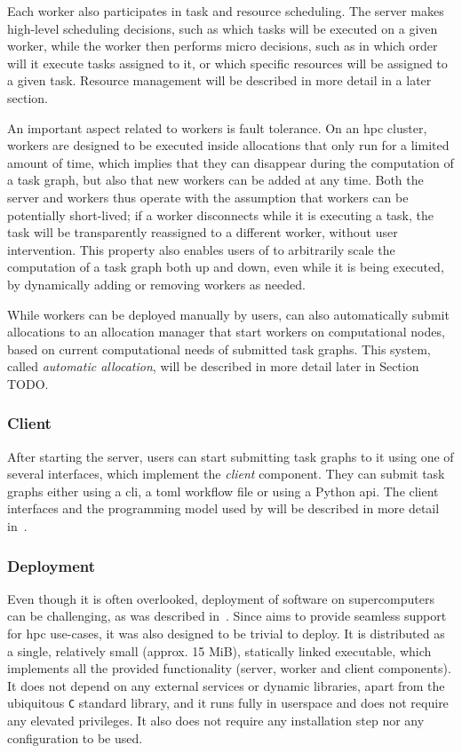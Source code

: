 Each worker also participates in task and resource scheduling. The server makes high-level
scheduling decisions, such as which tasks will be executed on a given worker, while the worker then
performs micro decisions, such as in which order will it execute tasks assigned to it, or which
specific resources will be assigned to a given task. Resource management will be described in more
detail in a later section.

An important aspect related to workers is fault tolerance. On an \gls{hpc} cluster,
\hyperqueue{} workers are designed to be executed inside allocations that only run for a
limited amount of time, which implies that they can disappear during the computation of a task
graph, but also that new workers can be added at any time. Both the server and workers thus operate
with the assumption that workers can be potentially short-lived; if a worker disconnects while it
is executing a task, the task will be transparently reassigned to a different worker, without user
intervention. This property also enables users of \hq{} to arbitrarily scale the
computation of a task graph both up and down, even while it is being executed, by dynamically
adding or removing workers as needed.

While workers can be deployed manually by users, \hq{} can also automatically
submit allocations to an allocation manager that start workers on computational nodes, based on
current computational needs of submitted task graphs. This system, called \emph{automatic allocation},
will be described in more detail later in Section TODO.

\subsubsection*{Client}
After starting the server, users can start submitting task graphs to it using one of several
interfaces, which implement the \emph{client} component. They can submit task graphs
either using a \gls{cli}, a \gls{toml} workflow file or using a Python
\gls{api}. The client interfaces and the programming model used by
\hq{} will be described in more detail in~.

\subsubsection*{Deployment}
Even though it is often overlooked, deployment of software on supercomputers can be challenging, as
was described in~. Since \hyperqueue{} aims to provide seamless
support for \gls{hpc} use-cases, it was also designed to be trivial to deploy. It is
distributed as a single, relatively small (approx. 15 MiB), statically linked executable, which
implements all the provided functionality (server, worker and client components). It does not
depend on any external services or dynamic libraries, apart from the ubiquitous
\texttt{C} standard library, and it runs fully in userspace and does not require any
elevated privileges. It also does not require any installation step nor any configuration to be
used.

